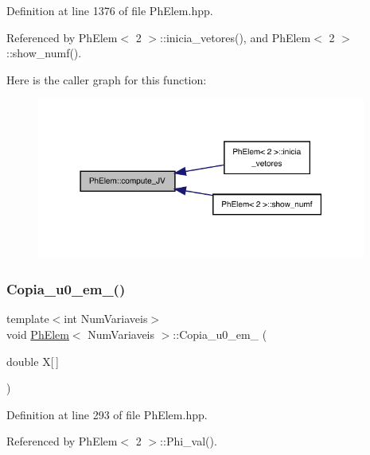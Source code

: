 Definition at line 1376 of file Ph\+Elem.\+hpp.



Referenced by Ph\+Elem$<$ 2 $>$\+::inicia\+\_\+vetores(), and Ph\+Elem$<$ 2 $>$\+::show\+\_\+numf().

Here is the caller graph for this function\+:
\nopagebreak
\begin{figure}[H]
\begin{center}
\leavevmode
\includegraphics[width=307pt]{classPhElem_abc4450898733d818edaa51a7f0d2bb58_icgraph}
\end{center}
\end{figure}
\mbox{\label{classPhElem_ac395c07742ced41887c4c12019454618}} 
\subsubsection{\texorpdfstring{Copia\+\_\+u0\+\_\+em\+\_\+()}{Copia\_u0\_em\_()}\hspace{0.1cm}{\footnotesize\ttfamily [1/2]}}
{\footnotesize\ttfamily template$<$int Num\+Variaveis$>$ \\
void \hyperlink{classPhElem}{Ph\+Elem}$<$ Num\+Variaveis $>$\+::Copia\+\_\+u0\+\_\+em\+\_\+ (\begin{DoxyParamCaption}\item[{double}]{X\mbox{[}$\,$\mbox{]} }\end{DoxyParamCaption})}



Definition at line 293 of file Ph\+Elem.\+hpp.



Referenced by Ph\+Elem$<$ 2 $>$\+::\+Phi\+\_\+val().

